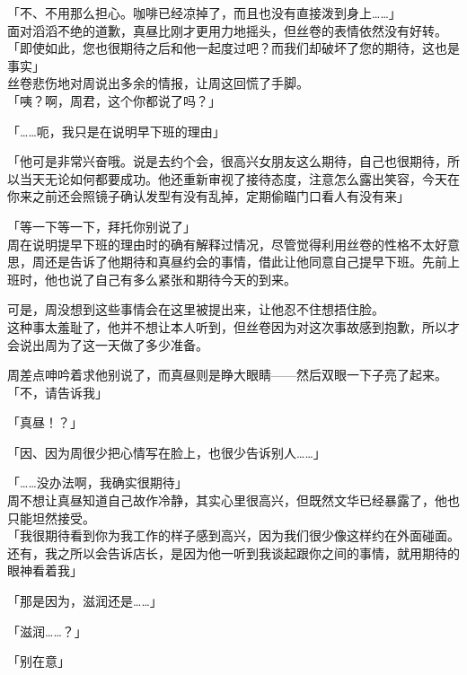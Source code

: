 「不、不用那么担心。咖啡已经凉掉了，而且也没有直接泼到身上……」\\

面对滔滔不绝的道歉，真昼比刚才更用力地摇头，但丝卷的表情依然没有好转。\\

「即使如此，您也很期待之后和他一起度过吧？而我们却破坏了您的期待，这也是事实」\\

丝卷悲伤地对周说出多余的情报，让周这回慌了手脚。\\

「咦？啊，周君，这个你都说了吗？」

「……呃，我只是在说明早下班的理由」

「他可是非常兴奋哦。说是去约个会，很高兴女朋友这么期待，自己也很期待，所以当天无论如何都要成功。他还重新审视了接待态度，注意怎么露出笑容，今天在你来之前还会照镜子确认发型有没有乱掉，定期偷瞄门口看人有没有来」

「等一下等一下，拜托你别说了」\\

周在说明提早下班的理由时的确有解释过情况，尽管觉得利用丝卷的性格不太好意思，周还是告诉了他期待和真昼约会的事情，借此让他同意自己提早下班。先前上班时，他也说了自己有多么紧张和期待今天的到来。

可是，周没想到这些事情会在这里被提出来，让他忍不住想捂住脸。\\

这种事太羞耻了，他并不想让本人听到，但丝卷因为对这次事故感到抱歉，所以才会说出周为了这一天做了多少准备。

周差点呻吟着求他别说了，而真昼则是睁大眼睛——然后双眼一下子亮了起来。\\

「不，请告诉我」

「真昼！？」

「因、因为周很少把心情写在脸上，也很少告诉别人……」

「……没办法啊，我确实很期待」\\

周不想让真昼知道自己故作冷静，其实心里很高兴，但既然文华已经暴露了，他也只能坦然接受。\\

「我很期待看到你为我工作的样子感到高兴，因为我们很少像这样约在外面碰面。还有，我之所以会告诉店长，是因为他一听到我谈起跟你之间的事情，就用期待的眼神看着我」

「那是因为，滋润还是……」

「滋润……？」

「别在意」\\

